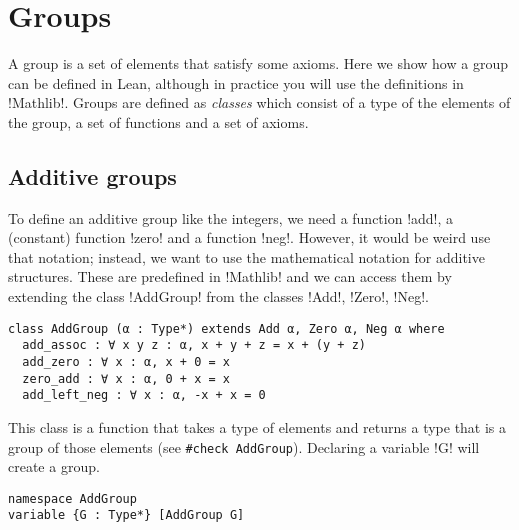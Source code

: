 
\section{Groups}

A group is a set of elements that satisfy some axioms. Here we show how a group can be defined in Lean, although in practice you will use the definitions in !Mathlib!. Groups are defined as \emph{classes} which consist of a type of the elements of the group, a set of functions and a set of axioms. 

\subsection{Additive groups}

To define an additive group like the integers, we need a function !add!, a (constant) function !zero! and a function !neg!. However, it would be weird use that notation; instead, we want to use the mathematical notation for additive structures. These are predefined in !Mathlib! and we can access them by extending the class !AddGroup! from the classes !Add!, !Zero!, !Neg!.
\begin{Verbatim}
class AddGroup (α : Type*) extends Add α, Zero α, Neg α where
  add_assoc : ∀ x y z : α, x + y + z = x + (y + z)
  add_zero : ∀ x : α, x + 0 = x
  zero_add : ∀ x : α, 0 + x = x
  add_left_neg : ∀ x : α, -x + x = 0
\end{Verbatim}


This class is a function that takes a type of elements and returns a type that is a group of those elements (see \Verb+#check AddGroup+). Declaring a variable !G! will create a group.

\begin{Verbatim}[firstnumber=last]
namespace AddGroup
variable {G : Type*} [AddGroup G]
\end{Verbatim}

